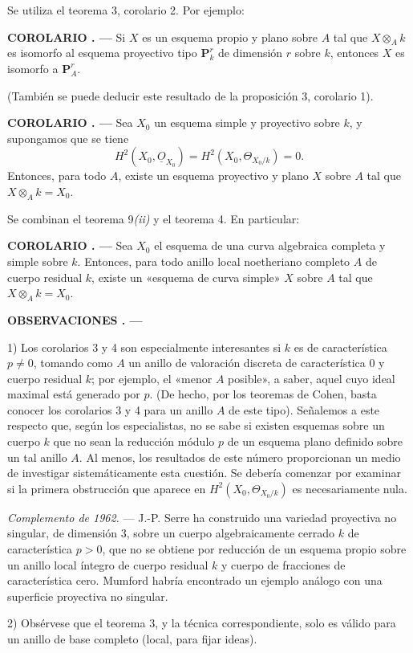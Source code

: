 \documentclass[11pt,twoside,openany]{book}
\numberwithin{equation}{section}
\newcommand{\Osh}{\underline{O}}
\theoremstyle{plain}
\theoremstyle{definition}
\theoremstyle{remark}
\newcommand{\result}[2]{%
  \par\medskip\noindent\textbf{#1%
  \if\relax\detokenize{#2}\relax\else\space#2\fi. ---}\enspace
}
\theoremstyle{plain}
\theoremstyle{definition}
\theoremstyle{remark}
\begin{document}
Se utiliza el teorema 3, corolario 2. Por ejemplo:

\result{COROLARIO}{2} Si $X$ es un esquema propio y plano sobre $A$ tal que
$X\otimes_A k$ es isomorfo al esquema proyectivo tipo $\mathbf P_k^r$ de
dimensión $r$ sobre $k$, entonces $X$ es isomorfo a $\mathbf P_A^r$.

(También se puede deducir este resultado de la proposición 3, corolario 1).

\result{COROLARIO}{3} Sea $X_0$ un esquema simple y proyectivo sobre $k$, y
supongamos que se tiene
\[
  H^2(X_0,\Osh_{X_0})=H^2(X_0,\Theta_{X_0/k})=0.
\]
Entonces, para todo $A$, existe un esquema proyectivo y plano $X$ sobre $A$ tal
que $X\otimes_A k=X_0$.

Se combinan el teorema 9\textit{(ii)} y el teorema 4. En particular:

\result{COROLARIO}{4} Sea $X_0$ el esquema de una curva algebraica completa y
simple sobre $k$. Entonces, para todo anillo local noetheriano completo $A$ de
cuerpo residual $k$, existe un «esquema de curva simple» $X$ sobre $A$ tal que
$X\otimes_A k=X_0$.

\result{OBSERVACIONES}{}

1) Los corolarios 3 y 4 son especialmente interesantes si $k$ es de
característica $p\ne0$, tomando como $A$ un anillo de valoración discreta de
característica $0$ y cuerpo residual $k$; por ejemplo, el «menor $A$ posible»,
a saber, aquel cuyo ideal maximal está generado por $p$. (De hecho, por los
teoremas de Cohen, basta conocer los corolarios 3 y 4 para un anillo $A$ de este
tipo). Señalemos a este respecto que, según los especialistas, no se sabe si
existen esquemas sobre un cuerpo $k$ que no sean la reducción módulo $p$ de un
esquema plano definido sobre un tal anillo $A$. Al menos, los resultados de este
número proporcionan un medio de investigar sistemáticamente esta cuestión. Se
debería comenzar por examinar si la primera obstrucción que aparece en
$H^2(X_0,\Theta_{X_0/k})$ es necesariamente nula.

\emph{Complemento de 1962.} --- J.-P. Serre ha construido una variedad
proyectiva no singular, de dimensión 3, sobre un cuerpo algebraicamente cerrado
$k$ de característica $p>0$, que no se obtiene por reducción de un esquema
propio sobre un anillo local íntegro de cuerpo residual $k$ y cuerpo de
fracciones de característica cero. Mumford habría encontrado un ejemplo análogo
con una superficie proyectiva no singular.

2) Obsérvese que el teorema 3, y la técnica correspondiente, solo es válido para
un anillo de base completo (local, para fijar ideas).
\end{document}
